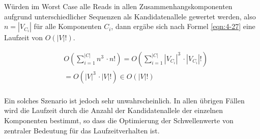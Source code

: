 Würden im Worst Case alle Reads in allen Zusammenhangskomponenten aufgrund unterschiedlicher Sequenzen als Kandidatenallele gewertet werden, also $n = |V_{C_{i}}|$ für alle Komponenten $C_{i}$, dann ergäbe sich nach Formel \eqref{eqn:4-27} eine Laufzeit von $O(|V|!)$. 

\begin{equation} \label{eqn:4-27}
\tag{4-27}
\begin{aligned}
&\ {} O\left(\sum_{i=1}^{|C|} n^3  \, \cdotp n! \right) = O\left(\sum_{i=1}^{|C|} |V_{C_{i}}|^3  \, \cdotp |V_{C_{i}}|! \right) \\
&\ = O(|V|^3  \, \cdotp |V|!) \in O(|V|!)\\
\end{aligned}
\end{equation}

Ein solches Szenario ist jedoch sehr unwahrscheinlich. In allen übrigen Fällen wird die Laufzeit durch die Anzahl der Kandidatenallele der einzelnen Komponenten bestimmt, so dass die Optimierung der Schwellenwerte von zentraler Bedeutung für das Laufzeitverhalten ist.
\let\cleardoublepage\clearpage